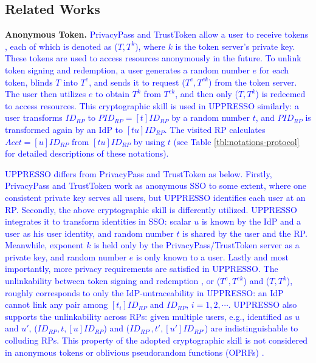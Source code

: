 \subsection{Related Works}
\label{sec:related}

%
\noindent\textbf{Anonymous Token.}
\textcolor{blue}{PrivacyPass and TrustToken allow a user to receive tokens \cite{privacypass,trusttoken}, each of which is denoted as ($T, T^{k}$), where $k$ is the token server's private key.
 These tokens are used to access resources anonymously in the future.
To unlink token signing and redemption,
    a user generates a random number $e$ for each token, blinds $T$ into $T^{e}$,
        and sends it to request ($T^e, T^{ek}$) from the token server.
The user then utilizes $e$ to obtain $T^k$ from $T^{ek}$, and then only ($T, T^{k}$) is redeemed to access resources.
This cryptographic skill \cite{oprf-proved} is used in UPPRESSO similarly:
    a user transforms $ID_{RP}$ to $PID_{RP} = [t]ID_{RP}$ by a random number $t$,
 and $PID_{RP}$ is transformed again by an IdP to $[tu]ID_{RP}$.
The visited RP calculates $Acct = [u]ID_{RP}$ from $[tu]ID_{RP}$ by using $t$
 (see Table \ref{tbl:notations-protocol} for detailed descriptions of these notations).}

\textcolor{blue}{UPPRESSO differs from PrivacyPass and TrustToken as below.
Firstly,
    PrivacyPass and TrustToken work as anonymous SSO to some extent, where one consistent private key serves all users,
but UPPRESSO identifies each user at an RP.
Secondly,
   the above cryptographic skill \cite{oprf-proved} is differently utilized.
UPPRESSO integrates it to transform identities in SSO:
scalar $u$ is known by the IdP and a user as his user identity, and
random number $t$ is shared by the user and the RP. Meanwhile,
exponent $k$ is held only by the PrivacyPass/TrustToken server as a private key,
 and random number $e$ is only known to a user.
Lastly and most importantly,
more privacy requirements are satisfied in UPPRESSO.
The unlinkability between token signing and redemption \cite{privacypass,trusttoken}, or
($T^e, T^{ek}$) and  ($T, T^k$),
roughly corresponds to only the IdP-untraceability in UPPRESSO:
 an IdP cannot link any pair among $[t_i]ID_{RP}$ and $ID_{RP}$,
 $i = 1, 2, \cdots$. %
UPPRESSO also supports the unlinkability across RPs:
given multiple users, e.g., identified as $u$ and $u'$,
    ($ID_{RP}, t, [u]ID_{RP}$) and ($ID_{RP'}, t', [u']ID_{RP'}$) are indistinguishable to
    colluding RPs.
This property of the adopted cryptographic skill is not considered
    in anonymous tokens \cite{privacypass,trusttoken} or oblivious pseudorandom functions (OPRFs) \cite{oprf-proved}.}


